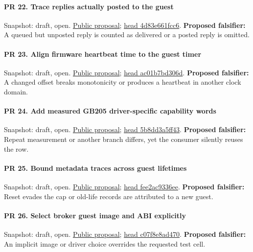 \paragraph{PR 22. Trace replies actually posted to the guest}
\readcode Snapshot: draft, open.
\href{\repobase/pull/22}{Public proposal};
\href{\repobase/commit/4d83e661fcc60f48235381308fd1091dea4351a5}{head 4d83e661fcc6}.
\textbf{Proposed falsifier:} A queued but unposted reply is counted as delivered or a posted reply
  is omitted.

\paragraph{PR 23. Align firmware heartbeat time to the guest timer}
\readcode Snapshot: draft, open.
\href{\repobase/pull/23}{Public proposal};
\href{\repobase/commit/ac01b7bd306dc00202f523cf1545b3cdf9ae026b}{head ac01b7bd306d}.
\textbf{Proposed falsifier:} A changed offset breaks monotonicity or produces a heartbeat in another
  clock domain.

\paragraph{PR 24. Add measured GB205 driver-specific capability words}
\readcode Snapshot: draft, open.
\href{\repobase/pull/24}{Public proposal};
\href{\repobase/commit/5b8dd3a5ff43c73d8434b7cae52e96ab5bc1d9b0}{head 5b8dd3a5ff43}.
\textbf{Proposed falsifier:} Repeat measurement or another branch differs, yet the consumer silently
  reuses the row.

\paragraph{PR 25. Bound metadata traces across guest lifetimes}
\readcode Snapshot: draft, open.
\href{\repobase/pull/25}{Public proposal};
\href{\repobase/commit/fee2ac9336eed69444b9edbb94a6d126d95f80e3}{head fee2ac9336ee}.
\textbf{Proposed falsifier:} Reset evades the cap or old-life records are attributed to a new guest.

\paragraph{PR 26. Select broker guest image and ABI explicitly}
\readcode Snapshot: draft, open.
\href{\repobase/pull/26}{Public proposal};
\href{\repobase/commit/c07f8e8ad4704a0a4060d499493f7ffe3bf3f2e3}{head c07f8e8ad470}.
\textbf{Proposed falsifier:} An implicit image or driver choice overrides the requested test cell.

